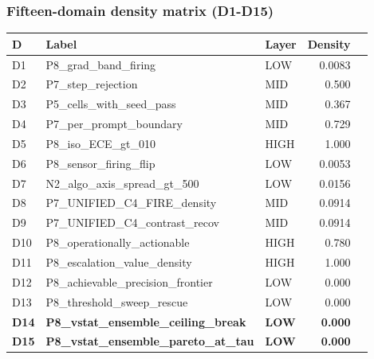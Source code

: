 \subsubsection{Fifteen-domain density matrix (D1-D15)}
\begin{tabular}{lllrr}
\hline
\textbf{D} & \textbf{Label} & \textbf{Layer} & \textbf{Density} \\
\hline
D1  & P8\_grad\_band\_firing            & LOW  & 0.0083 \\
D2  & P7\_step\_rejection              & MID  & 0.500 \\
D3  & P5\_cells\_with\_seed\_pass      & MID  & 0.367 \\
D4  & P7\_per\_prompt\_boundary        & MID  & 0.729 \\
D5  & P8\_iso\_ECE\_gt\_010            & HIGH & 1.000 \\
D6  & P8\_sensor\_firing\_flip         & LOW  & 0.0053 \\
D7  & N2\_algo\_axis\_spread\_gt\_500  & LOW  & 0.0156 \\
D8  & P7\_UNIFIED\_C4\_FIRE\_density  & MID  & 0.0914 \\
D9  & P7\_UNIFIED\_C4\_contrast\_recov & MID & 0.0914 \\
D10 & P8\_operationally\_actionable    & HIGH & 0.780 \\
D11 & P8\_escalation\_value\_density   & HIGH & 1.000 \\
D12 & P8\_achievable\_precision\_frontier & LOW & 0.000 \\
D13 & P8\_threshold\_sweep\_rescue     & LOW  & 0.000 \\
\textbf{D14} & \textbf{P8\_vstat\_ensemble\_ceiling\_break} & \textbf{LOW} & \textbf{0.000} \\
\textbf{D15} & \textbf{P8\_vstat\_ensemble\_pareto\_at\_tau} & \textbf{LOW} & \textbf{0.000} \\
\hline
\end{tabular}

